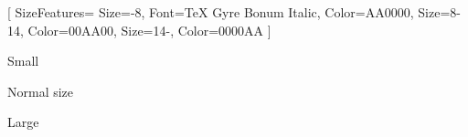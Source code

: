   [
    SizeFeatures={
      {Size={-8}, Font=TeX Gyre Bonum Italic, Color=AA0000},
      {Size={8-14}, Color=00AA00},
      {Size={14-}, Color=0000AA}} ]

  {\scriptsize Small\par} Normal size\par {\Large Large\par}
